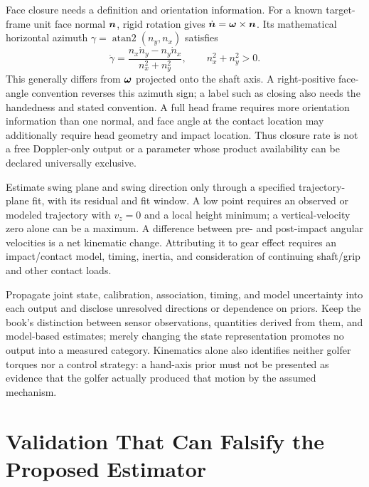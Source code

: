 Face closure needs a definition and orientation information.
For a known target-frame unit face normal $\bm{n}$, rigid rotation gives $\dot{\bm{n}}=\bm{\omega}\times\bm{n}$.
Its mathematical horizontal azimuth $\gamma=\operatorname{atan2}(n_y,n_x)$ satisfies
\begin{equation}
\label{eq:screw-closure}
\dot\gamma=\frac{n_x\dot n_y-n_y\dot n_x}{n_x^2+n_y^2},
\qquad n_x^2+n_y^2>0.
\end{equation}
This generally differs from $\bm{\omega}$ projected onto the shaft axis.
A right-positive face-angle convention reverses this azimuth sign; a label such as closing also needs the handedness and stated convention.
A full head frame requires more orientation information than one normal, and face angle at the contact location may additionally require head geometry and impact location.
Thus closure rate is not a free Doppler-only output or a parameter whose product availability can be declared universally exclusive.

Estimate swing plane and swing direction only through a specified trajectory-plane fit, with its residual and fit window.
A low point requires an observed or modeled trajectory with $v_z=0$ and a local height minimum; a vertical-velocity zero alone can be a maximum.
A difference between pre- and post-impact angular velocities is a net kinematic change.
Attributing it to gear effect requires an impact/contact model, timing, inertia, and consideration of continuing shaft/grip and other contact loads.

Propagate joint state, calibration, association, timing, and model uncertainty into each output and disclose unresolved directions or dependence on priors.
Keep the book's distinction between sensor observations, quantities derived from them, and model-based estimates; merely changing the state representation promotes no output into a measured category.
Kinematics alone also identifies neither golfer torques nor a control strategy: a hand-axis prior must not be presented as evidence that the golfer actually produced that motion by the assumed mechanism.

\section{Validation That Can Falsify the Proposed Estimator}
\label{sec:screw-validation}

